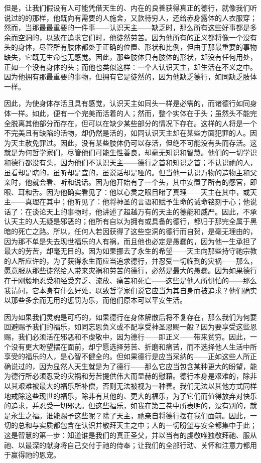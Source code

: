 但是，让我们假设有人可能凭借天生的、内在的良善获得真正的德行，就像我们听说过的的那样，他既向有需要的人施舍，又款待穷人，还给赤身露体的人衣服穿；然而，当那最最重要的一件事——认识天主——缺乏时，那么所有这些好事都是多余而空洞的，以致在追求它们时，他徒然劳苦。因为他所有的正义都将像一个没有头的身体，尽管所有肢体都处于正确的位置、形状和比例，但由于那最重要的事物缺失，它既无生命也无感觉。因此，那些肢体只有肢体的形状，却没有任何用处，正如一个没有身体的头；而他也类似这样：一个人认识天主，却生活在不义之中。因为他拥有那最重要的事物，但拥有它是徒然的，因为他缺乏德行，如同缺乏肢体一样。\par

因此，为使身体存活且具有感觉，认识天主如同头一样是必需的，而诸德行如同身体一样。如此，便有一个完美而活着的人；然而，整个实体在于头；虽然头不能完全脱离其他部分而存在，但可以在缺少某些部分的情况下存在。这样的人将是一个不完美且有缺陷的活物，却仍然是活的，如同认识天主却在某些方面犯罪的人。因为天主赦免罪过。因此，没有某些肢体仍可以存活，但绝不可能没有头而存活。这就是为何哲学家们，尽管他们可能生性善良，却毫无知识和智慧。他们的一切学识和德行都没有头，因为他们不认识天主——德行之首和知识之首；不认识祂的人，虽看却是瞎的，虽听却是聋的，虽说话却是哑的。但当他一认识万物的造物主和父亲时，他就会看、听和说话。因为他开始有了一个头，其中安置了所有的感官，即眼、耳和舌。因为他确实看见了：他以心灵之眼目睹了真理——天主在其中，或天主——真理在其中；他听见了：他将神圣的言语和赋予生命的诫命铭刻于心；他说话了：在谈论天上的事物时，他讲述了超越万有的天主的德能和威严。因此，不承认天主的人无疑是邪恶的；他所有自以为拥有或具备的德行，都归于那完全属于黑暗的死亡之路。所以，任何人若因获得了这些空洞的德行而自贺，是毫无理由的，因为那不单是失去现世福乐的人有祸，而且他也必定是愚蠢的，因为他一生承担了最大的劳苦，却毫无目的。因为如果挪去了永生的希望——天主向那些持守祂宗教的人所应许的，为了获得永生而应当追求德行，并忍受一切临到的灾祸——那么，愿意服从那些徒然给人带来灾祸和劳苦的德行，必然是最大的愚蠢。因为如果德行在于刚毅地忍受和经受穷乏、流放、痛苦和死亡——这些是他人所惧怕的——那么我请问，它本身有什么好处，以致哲学家们说它应当为其自身而被追求？他们确实以那些多余而无用的惩罚为乐，而他们原本可以平安生活。\par

因为如果我们灵魂是可朽的，如果德行在身体解散后将不复存在，那么我们为何要回避赐予我们的福乐，如同忘恩负义或不配享受神圣恩赐一般？因为要享受这些恩赐，我们必须活在邪恶和不虔敬中，因为德行——即正义——带来贫穷。因此，一个没有更大盼望摆在面前，却宁愿选择劳苦、折磨和痛苦，而不选择他人生活中所享受的福乐的人，是心智不健全的。但如果德行是应当采纳的——正如这些人所正确说过的，因为显然人天生就是为了德行——那么它应当包含某种更大的盼望，能为德行所必须忍受的灾祸和劳苦提供伟大而显赫的慰藉。德行本身是艰难的，除非以其艰难被最大的福乐所补偿，否则无法被视为一种善。我们无法以其他方式同样地戒除这些现世的福乐，除非有其他的、更大的福乐，为了它们而值得放弃对快乐的追求，并忍受一切邪恶。但这些福乐，如我在第三卷中所表明的，没有别的，就是永生之福。谁能赐予这些呢？除了天主，祂亲自将德行摆在我们面前。因此，一切的总和与实质都包含在认识并敬拜天主之中；人的一切盼望与安全都集中于此；这是智慧的第一步：知道谁是我们的真正圣父，并以当有的虔敬唯独敬拜祂、服从祂、以最深的献身将自己交付于祂的侍奉；让我们的全部行动、关怀和注意力都用于赢得祂的恩宠。\par

